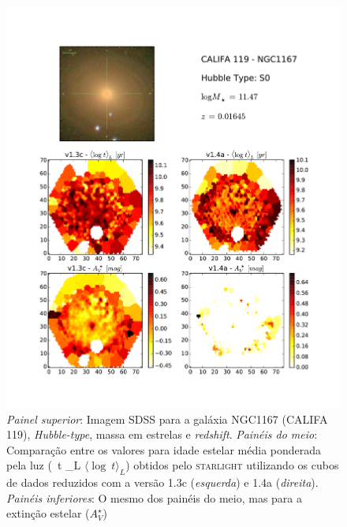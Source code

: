 \documentclass[a4paper,12pt]{article}
\newcommand{\meanL}[1]{\relax\ifmmode \langle #1 \rangle_L \else $\langle #1 \rangle_L$\xspace \fi}
\def\starlight{\textsc{starlight}\xspace}      %
\def\SDSS{SDSS\xspace}           %
\begin{document}
\begin{figure}
	\begin{center}
    \includegraphics[height=1.\textwidth]{figuras/K0119-compv13v14-atflux_av.pdf}
    \caption{{\em Painel superior}: Imagem \SDSS para a galáxia NGC1167 (CALIFA 119), {\em Hubble-type}, massa em estrelas e
    {\em redshift}. {\em Painéis do meio}: Comparação entre os valores para idade estelar média ponderada pela luz (\meanL{\log\ t}) obtidos pelo
    \starlight utilizando os cubos de dados reduzidos com a versão 1.3c ({\em esquerda}) e 1.4a ({\em direita}). {\em Painéis inferiores}: O mesmo
    dos painéis do meio, mas para a extinção estelar ($A_V^\star$)}
    \label{fig:K0119v13v14}
    \end{center}
\end{figure}
\end{document}
